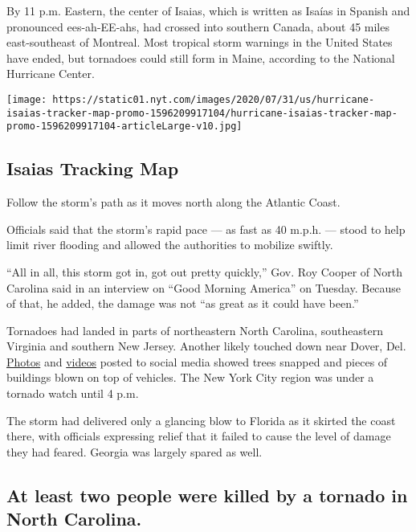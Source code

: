 By 11 p.m. Eastern, the center of Isaias, which is written as Isaías in
Spanish and pronounced ees-ah-EE-ahs, had crossed into southern Canada,
about 45 miles east-southeast of Montreal. Most tropical storm warnings
in the United States have ended, but tornadoes could still form in
Maine, according to the National Hurricane Center.

\href{https://www.nytimes.com/interactive/2020/07/31/us/hurricane-isaias-tracker-map.html}{}

\texttt{[image: https://static01.nyt.com/images/2020/07/31/us/hurricane-isaias-tracker-map-promo-1596209917104/hurricane-isaias-tracker-map-promo-1596209917104-articleLarge-v10.jpg]}

\hypertarget{isaias-tracking-map}{%
\subsection{Isaias Tracking Map}\label{isaias-tracking-map}}

Follow the storm's path as it moves north along the Atlantic Coast.

Officials said that the storm's rapid pace --- as fast as 40 m.p.h. ---
stood to help limit river flooding and allowed the authorities to
mobilize swiftly.

``All in all, this storm got in, got out pretty quickly,'' Gov. Roy
Cooper of North Carolina said in an interview on ``Good Morning
America'' on Tuesday. Because of that, he added, the damage was not ``as
great as it could have been.''

Tornadoes had landed in parts of northeastern North Carolina,
southeastern Virginia and southern New Jersey. Another likely touched
down near Dover, Del.
\href{https://slack-redir.net/link?url=https\%3A\%2F\%2Ftwitter.com\%2FRichWirdzekWx\%2Fstatus\%2F1290684400825438208}{Photos}
and
\href{https://slack-redir.net/link?url=https\%3A\%2F\%2Ftwitter.com\%2FDKDRinc\%2Fstatus\%2F1290688365830995969}{videos}
posted to social media showed trees snapped and pieces of buildings
blown on top of vehicles. The New York City region was under a tornado
watch until 4 p.m.

The storm had delivered only a glancing blow to Florida as it skirted
the coast there, with officials expressing relief that it failed to
cause the level of damage they had feared. Georgia was largely spared as
well.

\hypertarget{at-least-two-people-were-killed-by-a-tornado-in-north-carolina}{%
\subsection{At least two people were killed by a tornado in North
Carolina.}\label{at-least-two-people-were-killed-by-a-tornado-in-north-carolina}}

